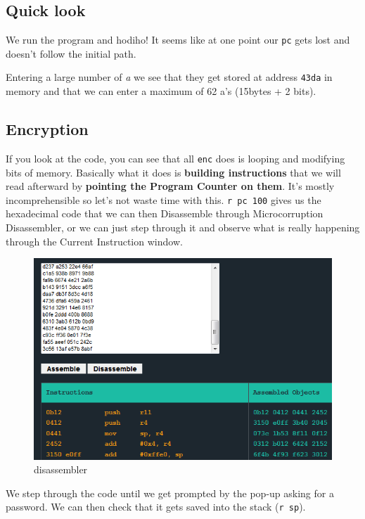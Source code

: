 \documentclass[a4paper,11pt]{article}
\begin{document}
\subsection{Quick look}\label{quick-look}

We run the program and hodiho! It seems like at one point our
\texttt{pc} gets lost and doesn't follow the initial path.

Entering a large number of \emph{a} we see that they get stored at
address \texttt{43da} in memory and that we can enter a maximum of 62
a's (15bytes + 2 bits).

\subsection{Encryption}\label{encryption}

If you look at the code, you can see that all \texttt{enc} does is
looping and modifying bits of memory. Basically what it does is
\textbf{building instructions} that we will read afterward by
\textbf{pointing the Program Counter on them}. It's mostly
incomprehensible so let's not waste time with this. \texttt{r pc 100}
gives us the hexadecimal code that we can then Disassemble through
Microcorruption Disassembler, or we can just step through it and observe
what is really happening through the Current Instruction window.

\begin{figure}[htbp]
\centering
\includegraphics{img/5_1.PNG}
\caption{disassembler}
\end{figure}

We step through the code until we get prompted by the pop-up asking for
a password. We can then check that it gets saved into the stack
(\texttt{r sp}).
\end{document}
